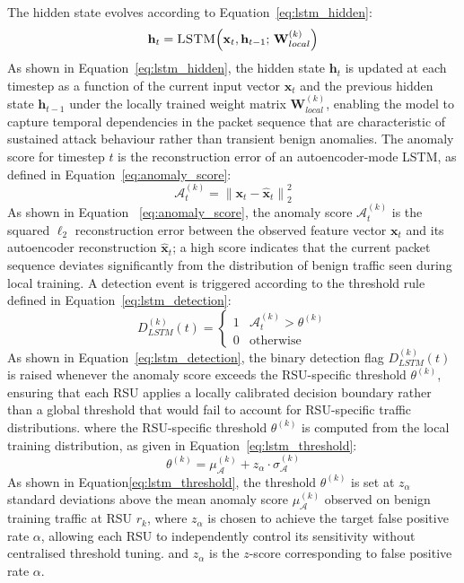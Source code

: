 \documentclass[12pt, a4paper]{report}
\begin{document}
The hidden state evolves
according to Equation~\eqref{eq:lstm_hidden}:
\begin{equation}
\mathbf{h}_t = \textsc{LSTM}\!\left(\mathbf{x}_t, \mathbf{h}_{t-1};\,
\mathbf{W}_{local}^{(k)}\right)
\label{eq:lstm_hidden}
\end{equation}
As shown in Equation~\eqref{eq:lstm_hidden}, the hidden state
$\mathbf{h}_t$ is updated at each timestep as a function of the
current input vector $\mathbf{x}_t$ and the previous hidden state
$\mathbf{h}_{t-1}$ under the locally trained weight matrix
$\mathbf{W}_{local}^{(k)}$, enabling the model to capture temporal
dependencies in the packet sequence that are characteristic of
sustained attack behaviour rather than transient benign anomalies.
The anomaly score for timestep $t$ is the reconstruction error of an
autoencoder-mode LSTM,
as defined in Equation~\eqref{eq:anomaly_score}:
\begin{equation}
\mathcal{A}_t^{(k)} =
\left\|\mathbf{x}_t - \hat{\mathbf{x}}_t\right\|_2^2
\label{eq:anomaly_score}
\end{equation}
As shown in Equation ~\eqref{eq:anomaly_score}, the anomaly
score $\mathcal{A}_t^{(k)}$ is the squared $\ell_2$ reconstruction
error between the observed feature vector $\mathbf{x}_t$ and its
autoencoder reconstruction $\hat{\mathbf{x}}_t$; a high score
indicates that the current packet sequence deviates significantly
from the distribution of benign traffic seen during local training.
A detection event is triggered
according to the threshold rule defined in
Equation~\eqref{eq:lstm_detection}:
\begin{equation}
D_{LSTM}^{(k)}(t) =
\begin{cases}
1 & \mathcal{A}_t^{(k)} > \theta^{(k)} \\
0 & \text{otherwise}
\end{cases}
\label{eq:lstm_detection}
\end{equation}
As shown in Equation~\eqref{eq:lstm_detection}, the binary
detection flag $D_{LSTM}^{(k)}(t)$ is raised whenever the anomaly
score exceeds the RSU-specific threshold $\theta^{(k)}$, ensuring
that each RSU applies a locally calibrated decision boundary rather
than a global threshold that would fail to account for
RSU-specific traffic distributions.
where the RSU-specific threshold $\theta^{(k)}$ is computed from the
local training distribution,
as given in Equation~\eqref{eq:lstm_threshold}:
\begin{equation}
\theta^{(k)} = \mu_{\mathcal{A}}^{(k)} + z_\alpha \cdot \sigma_{\mathcal{A}}^{(k)}
\label{eq:lstm_threshold}
\end{equation}
As shown in Equation\eqref{eq:lstm_threshold}, the threshold
$\theta^{(k)}$ is set at $z_\alpha$ standard deviations above the
mean anomaly score $\mu_{\mathcal{A}}^{(k)}$ observed on benign
training traffic at RSU $r_k$, where $z_\alpha$ is chosen to achieve
the target false positive rate $\alpha$, allowing each RSU to
independently control its sensitivity without centralised threshold
tuning.
and $z_\alpha$ is the $z$-score corresponding to false positive rate
$\alpha$.
\end{document}
